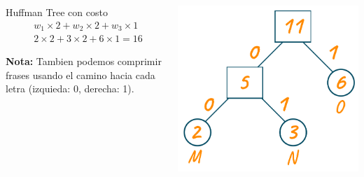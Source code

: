 \documentclass[12pt]{beamer}
\begin{document}
\begin{frame}

\begin{ejemplo}
\begin{columns}
\begin{column}{0.6\textwidth}
Huffman Tree con costo 
\begin{align*}
    &w_1 \times 2 + w_2 \times 2 + w_3 \times 1\\
    &2 \times 2 + 3 \times 2 + 6 \times 1 = 16
\end{align*}

\textbf{Nota:} Tambien podemos comprimir frases usando el camino hacia cada letra (izquieda: 0, derecha: 1).
    
\end{column}

\begin{column}{0.31\textwidth}
\includegraphics[width=\textwidth]{img/huffman.png}    
\end{column}

\end{columns}
\end{ejemplo}

\end{frame}
\end{document}
